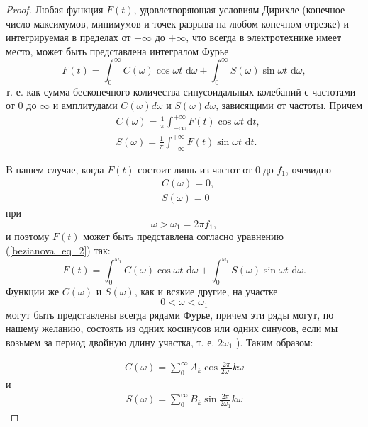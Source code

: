 \begin{proof} Любая функция $F(t)$, удовлетворяющая условиям Дирихле (конечное число максимумов, минимумов и точек разрыва на любом конечном отрезке) и интегрируемая в пределах от $-\infty$ до $+\infty$, что всегда в электротехнике имеет место, может быть представлена интегралом Фурье
\begin{equation}\label{bezianova_eq_2}
    F(t)=\int_0^{\infty} C(\omega) \cos \omega t \text{ d} \omega+\int_0^{\infty} S(\omega) \sin \omega t \text{ d} \omega,
\end{equation}
т. е. как сумма бесконечного количества синусоидальных колебаний с частотами от 0 до $\infty$ и амплитудами $C(\omega) d \omega$ и $S(\omega) d \omega$, зависящими от частоты. Причем
\begin{equation} \label{bezianova_eq_3}
\begin{aligned}
& C(\omega)=\frac{1}{\pi} \int_{-\infty}^{+\infty} F(t) \cos \omega t \text{ d} t, \\
& S(\omega)=\frac{1}{\pi} \int_{-\infty}^{+\infty} F(t) \sin \omega t \text{ d} t.
\end{aligned}
\end{equation}

B нашем случае, когда $F(t)$ состоит лишь из частот от 0 до $f_1$, очевидно
$$
\begin{aligned}
& C(\omega)=0, \\
& S(\omega)=0
\end{aligned}
$$
при
$$
\omega>\omega_1=2 \pi f_1,
$$
и поэтому $F(t)$ может быть представлена согласно уравнению (\ref{bezianova_eq_2}) так:
\begin{equation}\label{bezianova_eq_4}
    F(t)=\int_0^{\omega_1} C(\omega) \cos \omega t \text{ d} \omega+\int_0^{\omega_1} S(\omega) \sin \omega t \text{ d} \omega.
\end{equation}
\qquad Функции же $C(\omega)$ и $S(\omega)$, как и всякие другие, на участке
$$
0<\omega<\omega_1
$$
могут быть представлены всегда рядами Фурье, причем эти ряды могут, по нашему желанию, состоять из одних косинусов или одних синусов, если мы возьмем за период двойную длину участка, т. е. $2 \omega_1$ ). Таким образом:


\begin{subequations}\label{bezianova_eq_5a}
\begin{align}
    C(\omega)=\sum_0^{\infty} A_k \cos \frac{2 \pi}{2 \omega_1} k \omega
    \end{align}
\end{subequations}
и
\begin{subequations}\label{bezianova_eq_5b}
\begin{align}
    S(\omega)=\sum_0^{\infty} B_k \sin \frac{2 \pi}{2 \omega_1} k \omega 
\end{align}
\end{subequations}



\end{proof}
